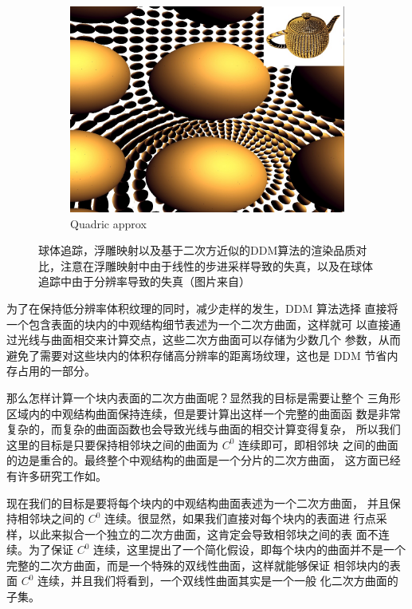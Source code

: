 \begin{figure}
\begin{fullwidth}
\begin{subfigure}[b]{0.202\thewidth}
		\includegraphics[width=\textwidth]{graphics/df/ddm-quadric-approx-2}	
		\caption{Quadric approx}
	\end{subfigure}
	\caption{球体追踪，浮雕映射以及基于二次方近似的DDM算法的渲染品质对比，注意在浮雕映射中由于线性的步进采样导致的失真，以及在球体追踪中由于分辨率导致的失真（图片来自\cite{a:directional-distance-maps}）}
	\label{f:df-ddm-comparation}
\end{fullwidth}	
\end{figure}

为了在保持低分辨率体积纹理的同时，减少走样的发生，DDM 算法选择 直接将一个包含表面的块内的中观结构细节表述为一个二次方曲面，这样就可 以直接通过光线与曲面相交来计算交点，这些二次方曲面可以存储为少数几个 参数，从而避免了需要对这些块内的体积存储高分辨率的距离场纹理，这也是 DDM 节省内存占用的一部分。

那么怎样计算一个块内表面的二次方曲面呢？显然我的目标是需要让整个 三角形区域内的中观结构曲面保持连续，但是要计算出这样一个完整的曲面函 数是非常复杂的，而复杂的曲面函数也会导致光线与曲面的相交计算变得复杂， 所以我们这里的目标是只要保持相邻块之间的曲面为 $C^{0}$ 连续即可，即相邻块 之间的曲面的边是重合的。最终整个中观结构的曲面是一个分片的二次方曲面， 这方面已经有许多研究工作如\cite{a:Asurveyofmethodsforrecoveringquadricsintrianglemeshes,a:Sparselowdegreeimplicitsurfaceswithapplicationstohighqualityrenderingfeatureextractionandsmoothing,Incremental raycasting of piecewise quadratic surfaces on the gpu}。

现在我们的目标是要将每个块内的中观结构曲面表述为一个二次方曲面， 并且保持相邻块之间的 $C^{0}$ 连续。很显然，如果我们直接对每个块内的表面进 行点采样，以此来拟合一个独立的二次方曲面，这肯定会导致相邻块之间的表 面不连续。为了保证 $C^{0}$ 连续，这里提出了一个简化假设，即每个块内的曲面并不是一个完整的二次方曲面，而是一个特殊的双线性曲面，这样就能够保证 相邻块内的表面 $C^{0}$ 连续，并且我们将看到，一个双线性曲面其实是一个一般 化二次方曲面的子集。

